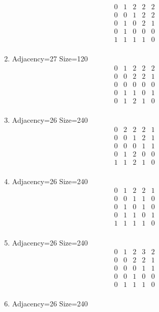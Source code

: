 \documentclass[12pt]{article}
\begin{document}
\begin{multicols}{3}
\begin{enumerate}
\begin{equation*}
\begin{array}{ccccc}
0&1&2&2&2\\
0&0&1&2&2\\
0&1&0&2&1\\
0&1&0&0&0\\
1&1&1&1&0\\
\end{array}
\end{equation*}
\item Adjacency=27 Size=120
\begin{equation*}
\begin{array}{ccccc}
0&1&2&2&2\\
0&0&2&2&1\\
0&0&0&0&0\\
0&1&1&0&1\\
0&1&2&1&0\\
\end{array}
\end{equation*}
\item Adjacency=26 Size=240
\begin{equation*}
\begin{array}{ccccc}
0&2&2&2&1\\
0&0&1&2&1\\
0&0&0&1&1\\
0&1&2&0&0\\
1&1&2&1&0\\
\end{array}
\end{equation*}
\item Adjacency=26 Size=240
\begin{equation*}
\begin{array}{ccccc}
0&1&2&2&1\\
0&0&1&1&0\\
0&1&0&1&0\\
0&1&1&0&1\\
1&1&1&1&0\\
\end{array}
\end{equation*}
\item Adjacency=26 Size=240
\begin{equation*}
\begin{array}{ccccc}
0&1&2&3&2\\
0&0&2&2&1\\
0&0&0&1&1\\
0&0&1&0&0\\
0&1&1&1&0\\
\end{array}
\end{equation*}
\item Adjacency=26 Size=240

\end{enumerate}
\end{multicols}
\end{document}
